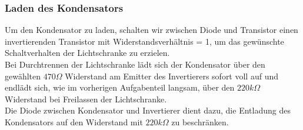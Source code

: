 \subsubsection{Laden des Kondensators}

Um den Kondensator zu laden, schalten wir zwischen Diode und Transistor einen invertierenden Transistor mit Widerstandsverhältnis = 1, um das gewünschte Schaltverhalten der Lichtschranke zu erzielen.\\
Bei Durchtrennen der Lichtschranke lädt sich der Kondensator über den gewählten $470 \Omega$ Widerstand am Emitter des Invertierers sofort voll auf und endlädt sich, wie im vorherigen Aufgabenteil langsam, über den $220 k \Omega$ Widerstand bei Freilassen der Lichtschranke.\\
Die Diode zwischen Kondensator und Invertierer dient dazu, die Entladung des Kondensators auf den Widerstand mit $220 k \Omega$ zu beschränken.

